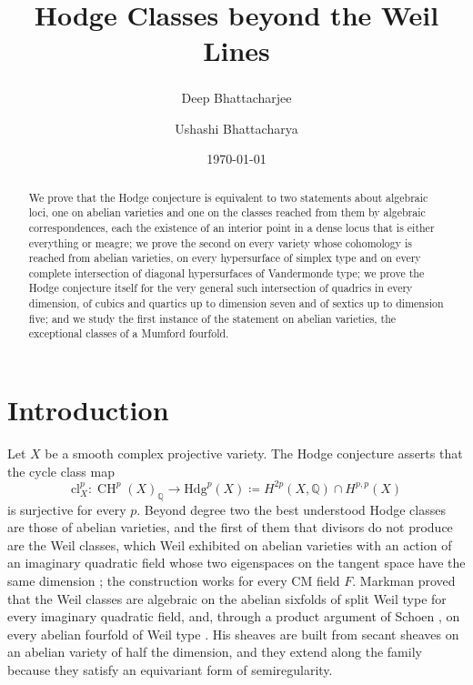 \documentclass[11pt,reqno]{amsart}
\title[Hodge classes beyond the Weil lines]
      {Hodge Classes beyond the Weil Lines}
\author{Deep Bhattacharjee\textsuperscript{\dag}}
\author{Ushashi Bhattacharya}
\date{\today}
\theoremstyle{plain}
\theoremstyle{definition}
\theoremstyle{remark}
\newcommand{\QQ}{\mathbb{Q}}
\newcommand{\Hdg}{\mathrm{Hdg}}
\newcommand{\cl}{\mathrm{cl}}
\DeclareMathOperator{\CH}{CH}
\begin{document}
\begin{abstract}
We prove that the Hodge conjecture is equivalent to two statements about
algebraic loci, one on abelian varieties and one on the classes reached from
them by algebraic correspondences, each the existence of an interior point
in a dense locus that is either everything or meagre; we prove the second on
every variety whose cohomology is reached from abelian varieties, on every
hypersurface of simplex type and on every complete intersection of diagonal
hypersurfaces of Vandermonde type; we prove the Hodge conjecture itself for
the very general such intersection of quadrics in every dimension, of cubics
and quartics up to dimension seven and of sextics up to dimension five; and
we study the first instance of the statement on abelian varieties, the
exceptional classes of a Mumford fourfold.
\end{abstract}

\maketitle

\setcounter{tocdepth}{1}
\begingroup
\setlength{\parskip}{0pt}
\tableofcontents
\endgroup

\section{Introduction}\label{sec:intro}

Let $X$ be a smooth complex projective variety. The Hodge conjecture asserts
that the cycle class map
\[
  \cl^{p}_{X}\colon \CH^{p}(X)_{\QQ}\longrightarrow \Hdg^{p}(X)
  \coloneqq H^{2p}(X,\QQ)\cap H^{p,p}(X)
\]
is surjective for every $p$. Beyond degree two the best understood Hodge
classes are those of abelian varieties, and the first of them that divisors
do not produce are the Weil classes, which Weil exhibited on abelian
varieties with an action of an imaginary quadratic field whose two
eigenspaces on the tangent space have the same dimension \cite{Weil77}; the
construction works for every CM field $F$. Markman proved that the Weil
classes are algebraic on the abelian sixfolds of split Weil type for every
imaginary quadratic field, and, through a product argument of Schoen
\cite[Proposition~10]{Sch98}, on every abelian fourfold of Weil type
\cite{Mar25a,Mar25b}. His sheaves are built from secant sheaves on an abelian
variety of half the dimension, and they extend along the family because they
satisfy an equivariant form of semiregularity.
\end{document}
